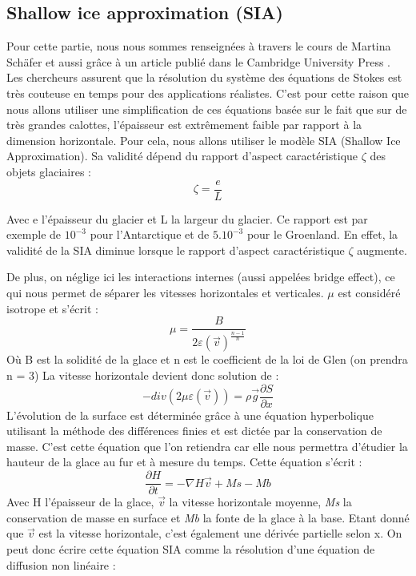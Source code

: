 \documentclass{article}
\begin{document}
 \newpage
\subsection{Shallow ice approximation (SIA)}


Pour cette partie, nous nous sommes renseignées à travers le cours de Martina Schäfer \cite{schafer2007modelisation} et aussi grâce à un article publié dans le Cambridge University Press  \cite{seroussi_morlighem_rignot_khazendar_larour_mouginot_2013}.
\newline
Les chercheurs assurent que la résolution du système des équations de Stokes est très couteuse en temps pour des applications réalistes. C'est pour cette raison que nous allons utiliser une simplification de ces équations basée sur le fait que sur de très grandes calottes, l'épaisseur est extrêmement faible par rapport à la dimension horizontale. Pour cela, nous allons utiliser le modèle SIA (Shallow Ice Approximation). Sa validité dépend du rapport d'aspect caractéristique $\zeta$ des objets glaciaires :
\begin{equation}
\zeta = \frac{e}{L}
\label{eq2} 
\end{equation}

Avec e l'épaisseur du glacier et L la largeur du glacier. Ce rapport est par exemple de $10^{-3}$ pour l'Antarctique et de $5.10^{-3}$ pour le Groenland. En effet, la validité de la SIA diminue lorsque le rapport d'aspect caractéristique $\zeta$ augmente. 

De plus, on néglige ici les interactions internes (aussi appelées bridge effect), ce qui nous permet de séparer les vitesses horizontales et verticales. $\mu$ est considéré isotrope et s'écrit :
\begin{equation}
\mu = \frac{B}{2\varepsilon(\vec{v})^\frac{n-1}{n}}
\label{eq2}      
\end{equation}
Où B est la solidité de la glace et n est le coefficient de la loi de Glen (on prendra n = 3)
\newline
La vitesse horizontale devient donc solution de :
\begin{equation}
-div(2 \mu \varepsilon(\vec{v}))  = \rho \vec{g}\frac{{\partial}S}{\partial x}
\label{eq3}
\end{equation}
L'évolution de la surface est déterminée grâce à une équation hyperbolique utilisant la méthode des différences finies et est dictée par la conservation de masse. C'est cette équation que l'on retiendra car elle nous permettra d'étudier la hauteur de la glace au fur et à mesure du temps.
Cette équation s'écrit :
\begin{equation}
\frac{\partial H}{\partial t}=-\nabla H\vec{v} + Ms - Mb
\label{eq3}
\end{equation}
Avec H l'épaisseur de la glace, $\vec{v}$ la vitesse horizontale moyenne, \textit{Ms} la conservation de masse en surface et \textit{Mb} la fonte de la glace à la base.
Etant donné que $\vec{v}$ est la vitesse horizontale, c'est également une dérivée partielle selon x.
On peut donc écrire cette équation SIA comme la résolution d'une équation de diffusion non linéaire : 
\end{document}
